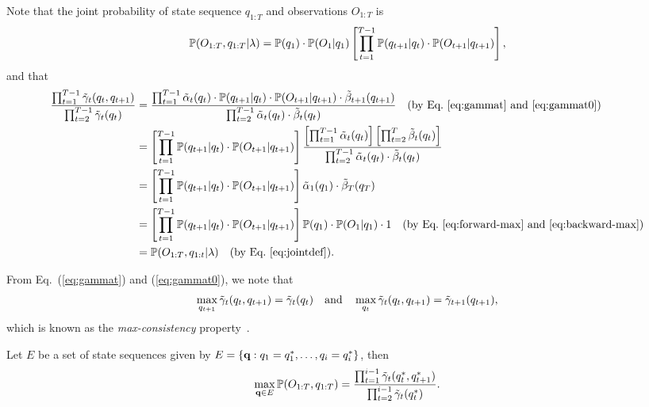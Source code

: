 Note that the joint probability of state sequence $q_{1:T}$ and observations $O_{1:T}$ is
\begin{equation}
\label{eq:jointdef}
\mathbb{P}(O_{1:T}, q_{1:T} |\lambda) = \mathbb{P}(q_1) \cdot \mathbb{P}(O_1 |q_1) \left[ \prod_{t=1}^{T-1} \mathbb{P}(q_{t+1} |q_t) \cdot \mathbb{P}(O_{t+1} |q_{t+1}) \right],
\end{equation}
and that
\begin{equation}
\label{eq:jointp}
\begin{aligned}
\frac{\prod_{t=1}^{T-1} \tilde{\gamma}_t(q_t, q_{t+1})} {\prod_{t=2}^{T-1} \tilde{\gamma}_t(q_t)} 
&= \frac{\prod_{t=1}^{T-1} \tilde{\alpha}_t(q_t) \cdot \mathbb{P}(q_{t+1} |q_t) \cdot \mathbb{P}(O_{t+1} |q_{t+1}) \cdot \tilde{\beta}_{t+1}(q_{t+1})}
        {\prod_{t=2}^{T-1} \tilde{\alpha}_t(q_t) \cdot \tilde{\beta}_t(q_t)} 
   ~~~ \text{(by Eq.~\ref{eq:gammat} and \ref{eq:gammat0})} \\
&= \left[ \prod_{t=1}^{T-1} \mathbb{P}(q_{t+1} |q_t) \cdot \mathbb{P}(O_{t+1} |q_{t+1}) \right]
   \frac{ \left[ \prod_{t=1}^{T-1} \tilde{\alpha}_t(q_t) \right] \left[ \prod_{t=2}^T \tilde{\beta}_t(q_t) \right] }
        {\prod_{t=2}^{T-1} \tilde{\alpha}_t(q_t) \cdot \tilde{\beta}_t(q_t)} \\
&= \left[ \prod_{t=1}^{T-1} \mathbb{P}(q_{t+1} |q_t) \cdot \mathbb{P}(O_{t+1} |q_{t+1}) \right] \tilde{\alpha}_1(q_1) \cdot \tilde{\beta}_T(q_T) \\
&= \left[ \prod_{t=1}^{T-1} \mathbb{P}(q_{t+1} |q_t) \cdot \mathbb{P}(O_{t+1} |q_{t+1}) \right] \mathbb{P}(q_1) \cdot \mathbb{P}(O_1 |q_1) \cdot 1 
   ~~~ \text{(by Eq.~\ref{eq:forward-max} and \ref{eq:backward-max})} \\
&= \mathbb{P}(O_{1:T}, q_{1:t} |\lambda) ~~~ \text{(by Eq.~\ref{eq:jointdef})}.
\end{aligned}
\end{equation}

From Eq.~(\ref{eq:gammat}) and (\ref{eq:gammat0}), we note that 
\begin{equation}
\label{eq:maxconsist}
\max_{q_{t+1}} \tilde{\gamma}_t(q_t, q_{t+1}) = \tilde{\gamma}_t(q_t) 
~~~ \text{and} ~~~
\max_{q_t} \tilde{\gamma}_t(q_t, q_{t+1}) = \tilde{\gamma}_{t+1}(q_{t+1}),
\end{equation}
which is known as the \emph{max-consistency} property~\cite{nilsson2001sequentially}.

\begin{lemma}
\label{lm:1}
Let $E$ be a set of state sequences given by $E = \{\mathbf{q} :q_1 = q_1^*, \dots, q_i = q_i^* \}$, then
\begin{equation*}
\max_{\mathbf{q} \in E} \mathbb{P}(O_{1:T}, q_{1:T}) = \frac{\prod_{t=1}^{i-1} \tilde{\gamma}_t(q_t^*, q_{t+1}^*)} {\prod_{t=2}^{i-1} \tilde{\gamma}_t(q_t^*)}.
\end{equation*}
\end{lemma}

